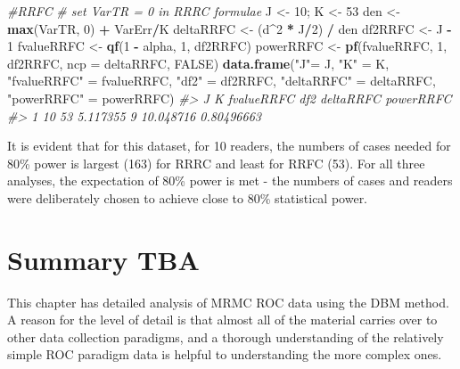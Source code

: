 \documentclass[
]{book}
\newenvironment{Shaded}{\begin{snugshade}}{\end{snugshade}}
\newcommand{\CommentTok}[1]{\textcolor[rgb]{0.56,0.35,0.01}{\textit{#1}}}
\newcommand{\DataTypeTok}[1]{\textcolor[rgb]{0.13,0.29,0.53}{#1}}
\newcommand{\DecValTok}[1]{\textcolor[rgb]{0.00,0.00,0.81}{#1}}
\newcommand{\KeywordTok}[1]{\textcolor[rgb]{0.13,0.29,0.53}{\textbf{#1}}}
\newcommand{\NormalTok}[1]{#1}
\newcommand{\OperatorTok}[1]{\textcolor[rgb]{0.81,0.36,0.00}{\textbf{#1}}}
\newcommand{\OtherTok}[1]{\textcolor[rgb]{0.56,0.35,0.01}{#1}}
\newcommand{\StringTok}[1]{\textcolor[rgb]{0.31,0.60,0.02}{#1}}
\begin{document}
\begin{Shaded}
\begin{Highlighting}[]
\CommentTok{#RRFC}
\CommentTok{# set VarTR = 0 in RRRC formulae}
\NormalTok{J <-}\StringTok{ }\DecValTok{10}\NormalTok{; K <-}\StringTok{ }\DecValTok{53}
\NormalTok{den <-}\StringTok{ }\KeywordTok{max}\NormalTok{(VarTR, }\DecValTok{0}\NormalTok{) }\OperatorTok{+}\StringTok{ }\NormalTok{VarErr}\OperatorTok{/}\NormalTok{K}
\NormalTok{deltaRRFC <-}\StringTok{ }\NormalTok{(d}\OperatorTok{^}\DecValTok{2} \OperatorTok{*}\StringTok{ }\NormalTok{J}\OperatorTok{/}\DecValTok{2}\NormalTok{) }\OperatorTok{/}\StringTok{ }\NormalTok{den}
\NormalTok{df2RRFC <-}\StringTok{ }\NormalTok{J }\OperatorTok{-}\StringTok{ }\DecValTok{1}
\NormalTok{fvalueRRFC <-}\StringTok{ }\KeywordTok{qf}\NormalTok{(}\DecValTok{1} \OperatorTok{-}\StringTok{ }\NormalTok{alpha, }\DecValTok{1}\NormalTok{, df2RRFC)}
\NormalTok{powerRRFC <-}\StringTok{ }\KeywordTok{pf}\NormalTok{(fvalueRRFC, }\DecValTok{1}\NormalTok{, df2RRFC, }\DataTypeTok{ncp =}\NormalTok{ deltaRRFC, }\OtherTok{FALSE}\NormalTok{)}
\KeywordTok{data.frame}\NormalTok{(}\StringTok{"J"}\NormalTok{=}\StringTok{ }\NormalTok{J,  }\StringTok{"K"}\NormalTok{ =}\StringTok{ }\NormalTok{K, }\StringTok{"fvalueRRFC"}\NormalTok{ =}\StringTok{ }\NormalTok{fvalueRRFC, }\StringTok{"df2"}\NormalTok{ =}\StringTok{ }\NormalTok{df2RRFC, }\StringTok{"deltaRRFC"}\NormalTok{ =}\StringTok{ }\NormalTok{deltaRRFC, }\StringTok{"powerRRFC"}\NormalTok{ =}\StringTok{ }\NormalTok{powerRRFC)}
\CommentTok{#>    J  K fvalueRRFC df2 deltaRRFC  powerRRFC}
\CommentTok{#> 1 10 53   5.117355   9 10.048716 0.80496663}
\end{Highlighting}
\end{Shaded}

It is evident that for this dataset, for 10 readers, the numbers of cases needed for 80\% power is largest (163) for RRRC and least for RRFC (53). For all three analyses, the expectation of 80\% power is met - the numbers of cases and readers were deliberately chosen to achieve close to 80\% statistical power.

\hypertarget{dbm-analysis-significance-testing-summary}{%
\section{Summary TBA}\label{dbm-analysis-significance-testing-summary}}

This chapter has detailed analysis of MRMC ROC data using the DBM method. A reason for the level of detail is that almost all of the material carries over to other data collection paradigms, and a thorough understanding of the relatively simple ROC paradigm data is helpful to understanding the more complex ones.
\end{document}
